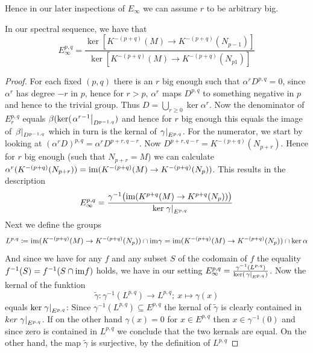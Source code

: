 Hence in our later inspections of $E_{\infty}$ we can assume $r$ to be arbitrary big.
\begin{lemma} \label{lem:SpectralSequence-theLastPageOfE}
	In our spectral sequence, we have that
	\begin{equation*}
		E_{\infty}^{p,q}=\frac{\ker[K^{-(p+q)}(M)\to K^{-(p+q)}(N_{p-1})]}{\ker[K^{-(p+q)}(M)\to K^{-(p+q)}(N_{p1})]}
	\end{equation*}
\end{lemma}
\begin{proof}
	For each fixed $(p,q)$ there is an $r$ big enough such that $\alpha^r D^{p,q}=0$, since $\alpha^r$ has degree $-r$ in $p$, hence for $r>p$, $\alpha^r$ maps $D^{p,q}$ to something negative in $p$ and hence to the trivial group.
	Thus $D=\bigcup_{r\geq 0}\ker \alpha^r$. Now the denominator of $E^{p,q}_r$ equals $\beta(\ker( \left.\alpha^{r-1}\right|_{D^{p-1,q}})$ and hence for $r$ big enough this equals the image of $\left.\beta\right|_{D^{p-1,q}}$ which in turn is the kernal of $\left.\gamma\right|_{E^{p,q}}$. For the numerator, we start by looking at $(\alpha^r D)^{p,q}=\alpha^rD^{p+r,q-r}$. Now $D^{p+r,q-r}=K^{-(p+q)}(N_{p+r})$. Hence for $r$ big enough (such that $N_{p+r}=M$) we can calculate $\alpha^r(K^{-(p+q)}(N_{p+r}))=\mathrm{im}(K^{-(p+q)}(M)\to K^{-(p+q)}(N_p))$. This results in the description
	\begin{equation*}
		E^{p,q}_\infty=\frac{\gamma^{-1}\big(\mathrm{im}(K^{p+q}(M)\to K^{p+q}(N_p))\big)}{\ker\left.\gamma\right|_{E^{p,q}}}
	\end{equation*}
	Next we define the groups
	\begin{equation*}
		L^{p,q}\coloneq \mathrm{im}(K^{-(p+q)}(M)\to K^{-(p+q)}(N_p)) \cap \mathrm{im} \gamma= \mathrm{im}(K^{-(p+q)}(M)\to K^{-(p+q)}(N_p)) \cap \ker \alpha
	\end{equation*}
	And since we have for any $f$ and any subset $S$ of the  codomain of $f$ the equality $f^{-1}(S)=f^{-1}(S\cap \mathrm{im} f)$ holds,
	we have in our setting $ E^{p,q}_\infty=\frac{\gamma^{-1}(L^{p,q})}{\ker(\left.\gamma\right|_{E^{p,q}})}$. Now the kernal of the funktion
	\begin{equation*}
		\tilde{\gamma}:\gamma^{-1} (L^{p,q})\to L^{p,q};~x\mapsto \gamma(x)
	\end{equation*} equals $\ker \left.\gamma\right|_{E^{p,q}}$: Since $\gamma^{-1} (L^{p,q})\subseteq E^{p,q}$ the kernal of  $\tilde{\gamma}$ is clearly contained in $ker \left.\gamma\right|_{E^{p,q}}$. If on the other hand $\gamma(x)=0$ for $x\in E^{p,q}$ then $x\in \gamma^{-1}(0)$ and since zero is contained in $L^{p,q}$ we conclude that the two kernals are equal. On the other hand, the map $\tilde{\gamma}$ is surjective, by the definition of $L^{p,q}$
	

\end{proof}
